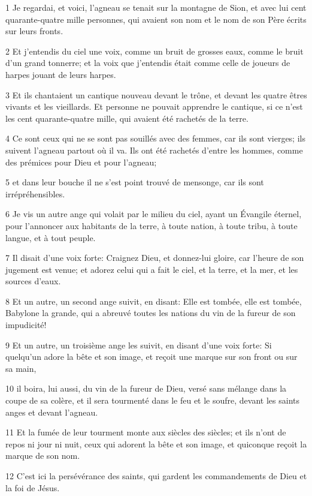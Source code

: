 \par 1 Je regardai, et voici, l'agneau se tenait sur la montagne de Sion, et avec lui cent quarante-quatre mille personnes, qui avaient son nom et le nom de son Père écrits sur leurs fronts.
\par 2 Et j'entendis du ciel une voix, comme un bruit de grosses eaux, comme le bruit d'un grand tonnerre; et la voix que j'entendis était comme celle de joueurs de harpes jouant de leurs harpes.
\par 3 Et ils chantaient un cantique nouveau devant le trône, et devant les quatre êtres vivants et les vieillards. Et personne ne pouvait apprendre le cantique, si ce n'est les cent quarante-quatre mille, qui avaient été rachetés de la terre.
\par 4 Ce sont ceux qui ne se sont pas souillés avec des femmes, car ils sont vierges; ils suivent l'agneau partout où il va. Ils ont été rachetés d'entre les hommes, comme des prémices pour Dieu et pour l'agneau;
\par 5 et dans leur bouche il ne s'est point trouvé de mensonge, car ils sont irrépréhensibles.
\par 6 Je vis un autre ange qui volait par le milieu du ciel, ayant un Évangile éternel, pour l'annoncer aux habitants de la terre, à toute nation, à toute tribu, à toute langue, et à tout peuple.
\par 7 Il disait d'une voix forte: Craignez Dieu, et donnez-lui gloire, car l'heure de son jugement est venue; et adorez celui qui a fait le ciel, et la terre, et la mer, et les sources d'eaux.
\par 8 Et un autre, un second ange suivit, en disant: Elle est tombée, elle est tombée, Babylone la grande, qui a abreuvé toutes les nations du vin de la fureur de son impudicité!
\par 9 Et un autre, un troisième ange les suivit, en disant d'une voix forte: Si quelqu'un adore la bête et son image, et reçoit une marque sur son front ou sur sa main,
\par 10 il boira, lui aussi, du vin de la fureur de Dieu, versé sans mélange dans la coupe de sa colère, et il sera tourmenté dans le feu et le soufre, devant les saints anges et devant l'agneau.
\par 11 Et la fumée de leur tourment monte aux siècles des siècles; et ils n'ont de repos ni jour ni nuit, ceux qui adorent la bête et son image, et quiconque reçoit la marque de son nom.
\par 12 C'est ici la persévérance des saints, qui gardent les commandements de Dieu et la foi de Jésus.
